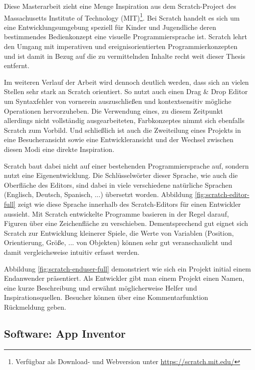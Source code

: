 Diese Masterarbeit zieht eine Menge Inspiration aus dem Scratch-Project des Massachusetts Institute of Technology (MIT)\footnote{Verfügbar als Download- und Webversion unter \url{https://scratch.mit.edu/}}. Bei Scratch handelt es sich um eine Entwicklungsumgebung speziell für Kinder und Jugendliche deren bestimmendes Bedienkonzept eine visuelle Programmiersprache ist. Scratch lehrt den Umgang mit imperativen und ereignisorientierten Programmierkonzepten und ist damit in Bezug auf die zu vermittelnden Inhalte recht weit dieser Thesis entfernt.

Im weiteren Verlauf der Arbeit wird dennoch deutlich werden, dass sich \idename{} an vielen Stellen sehr stark an Scratch orientiert. So nutzt auch \idename{} einen Drag \& Drop Editor um Syntaxfehler von vornerein auszuschließen und kontextsensitiv mögliche Operationen hervorzuheben. Die Verwendung eines, zu diesem Zeitpunkt allerdings nicht vollständig ausgearbeiteten, Farbkonzeptes nimmt sich ebenfalls Scratch zum Vorbild. Und schließlich ist auch die Zweiteilung eines Projekts in eine Besucheransicht sowie eine Entwickleransicht und der Wechsel zwischen diesen Modi eine direkte Inspiration.

Scratch baut dabei nicht auf einer bestehenden Programmiersprache auf, sondern nutzt eine Eigenentwicklung. Die Schlüsselwörter dieser Sprache, wie auch die Oberfläche des Editors, sind dabei in viele verschiedene natürliche Sprachen (Englisch, Deutsch, Spanisch, ...) übersetzt worden. Abbildung \ref{fig:scratch-editor-full} zeigt wie diese Sprache innerhalb des Scratch-Editors für einen Entwickler aussieht. Mit Scratch entwickelte Programme basieren in der Regel darauf, Figuren über eine Zeichenfläche zu verschieben. Dementsprechend gut eignet sich Scratch zur Entwicklung kleinerer Spiele, die Werte von Variablen (Position, Orientierung, Größe, ... von Objekten) können sehr gut veranschaulicht und damit vergleichsweise intuitiv erfasst werden.

Abbildung \ref{fig:scratch-enduser-full} demonstriert wie sich ein Projekt initial einem Endanwender präsentiert. Als Entwickler gibt man einem Projekt einen Namen, eine kurze Beschreibung und erwähnt möglicherweise Helfer und Inspirationsquellen. Besucher können über eine Kommentarfunktion Rückmeldung geben.

\newpage

\subsection{Software: App Inventor}

